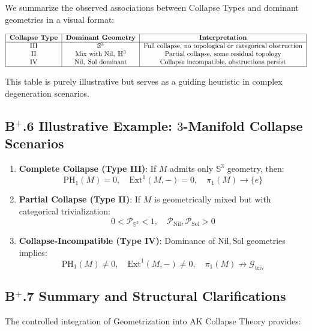 \documentclass[11pt]{article}
\begin{document}
We summarize the observed associations between Collapse Types and dominant geometries in a visual format:

\[
\begin{tabular}{|c|c|c|}
\hline
\textbf{Collapse Type} & \textbf{Dominant Geometry} & \textbf{Interpretation} \\
\hline
III & $\mathbb{S}^3$ & Full collapse, no topological or categorical obstruction \\
II  & Mix with $\mathrm{Nil},\; \mathbb{H}^3$ & Partial collapse, some residual topology \\
IV  & $\mathrm{Nil},\; \mathrm{Sol}$ dominant & Collapse incompatible, obstructions persist \\
\hline
\end{tabular}
\]

This table is purely illustrative but serves as a guiding heuristic in complex degeneration scenarios.

\subsection*{B$^{+}$.6 Illustrative Example: $3$-Manifold Collapse Scenarios}

\begin{enumerate}
    \item \textbf{Complete Collapse (Type III)}:  
    If $M$ admits only $\mathbb{S}^3$ geometry, then:
    \[
    \mathrm{PH}_1(M) = 0,\quad \mathrm{Ext}^1(M, -) = 0,\quad \pi_1(M) \longrightarrow \{e\}
    \]
    \item \textbf{Partial Collapse (Type II)}:  
    If $M$ is geometrically mixed but with categorical trivialization:
    \[
    0 < \mathcal{P}_{\mathbb{S}^3} < 1,\quad \mathcal{P}_{\mathrm{Nil}}, \mathcal{P}_{\mathrm{Sol}} > 0
    \]
    \item \textbf{Collapse-Incompatible (Type IV)}:  
    Dominance of $\mathrm{Nil}, \mathrm{Sol}$ geometries implies:
    \[
    \mathrm{PH}_1(M) \neq 0,\quad \mathrm{Ext}^1(M, -) \neq 0,\quad \pi_1(M) \not\to \mathcal{G}_{\mathrm{triv}}
    \]
\end{enumerate}

\subsection*{B$^{+}$.7 Summary and Structural Clarifications}

The controlled integration of Geometrization into AK Collapse Theory provides:
\end{document}
